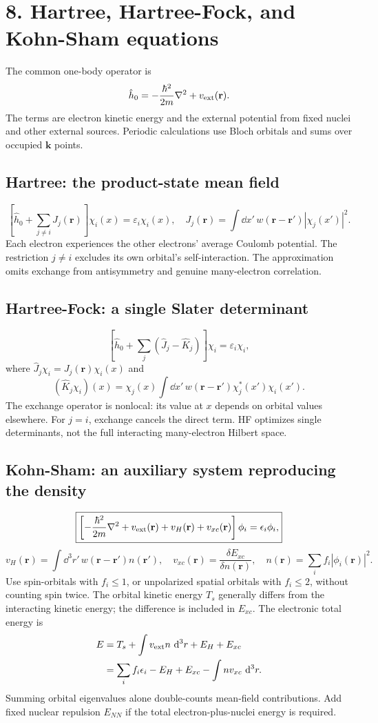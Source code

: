 \section*{8. Hartree, Hartree-Fock, and Kohn-Sham equations}
The common one-body operator is
\[
\hat h_0=-\frac{\hbar^2}{2m}\nabla^2+v_{\rm ext}(\mathbf r).
\]
The terms are electron kinetic energy and the external potential from fixed nuclei and other external sources. Periodic calculations use Bloch orbitals and sums over occupied $\mathbf k$ points.

\subsection*{Hartree: the product-state mean field}
\[
\boxed{\left[\hat h_0+\sum_{j\ne i}J_j(\mathbf r)\right]\chi_i(x)
=\varepsilon_i\chi_i(x),\quad
J_j(\mathbf r)=\int\dd x'\,w(\mathbf r-\mathbf r')|\chi_j(x')|^2.}
\]
Each electron experiences the other electrons' average Coulomb potential. The restriction $j\ne i$ excludes its own orbital's self-interaction. The approximation omits exchange from antisymmetry and genuine many-electron correlation.

\subsection*{Hartree-Fock: a single Slater determinant}
\[
\boxed{\left[\hat h_0+\sum_j(\hat J_j-\hat K_j)\right]\chi_i
=\varepsilon_i\chi_i,}
\]
where $\hat J_j\chi_i=J_j(\mathbf r)\chi_i(x)$ and
\[
(\hat K_j\chi_i)(x)=\chi_j(x)\int\dd x'\,
w(\mathbf r-\mathbf r')\chi_j^*(x')\chi_i(x').
\]
The exchange operator is nonlocal: its value at $x$ depends on orbital values elsewhere. For $j=i$, exchange cancels the direct term. HF optimizes single determinants, not the full interacting many-electron Hilbert space.

\subsection*{Kohn-Sham: an auxiliary system reproducing the density}
\[
\boxed{\left[-\frac{\hbar^2}{2m}\nabla^2+v_{\rm ext}(\mathbf r)
+v_H(\mathbf r)+v_{xc}(\mathbf r)\right]\phi_i
=\epsilon_i\phi_i,}
\]
\[
v_H(\mathbf r)=\int\dd^3r'\,w(\mathbf r-\mathbf r')n(\mathbf r'),\quad
v_{xc}(\mathbf r)=\frac{\delta E_{xc}}{\delta n(\mathbf r)},\quad
n(\mathbf r)=\sum_i f_i|\phi_i(\mathbf r)|^2.
\]
Use spin-orbitals with $f_i\leq1$, or unpolarized spatial orbitals with $f_i\leq2$, without counting spin twice. The orbital kinetic energy $T_s$ generally differs from the interacting kinetic energy; the difference is included in $E_{xc}$.
The electronic total energy is
\begin{align*}
E&=T_s+\int v_{\rm ext}n\,\mathop{}\!\mathrm{d}^3r+E_H+E_{xc}\\
 &=\sum_i f_i\epsilon_i-E_H+E_{xc}-\int n v_{xc}\,\mathop{}\!\mathrm{d}^3r.
\end{align*}
Summing orbital eigenvalues alone double-counts mean-field contributions. Add fixed nuclear repulsion $E_{NN}$ if the total electron-plus-nuclei energy is required.

